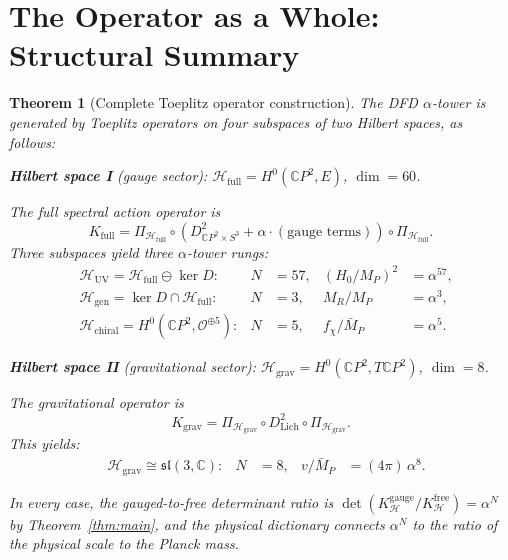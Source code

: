 \documentclass[11pt]{article}
\newtheorem{theorem}{Theorem}[section]
\theoremstyle{definition}
\theoremstyle{remark}
\newcommand{\CP}{\mathbb{C}P}
\newcommand{\Mp}{M_P}
\newcommand{\Mpr}{\bar{M}_P}
\begin{document}
\section{The Operator as a Whole: Structural Summary}
\label{sec:summary}

\begin{theorem}[Complete Toeplitz operator construction]
\label{thm:complete}
The DFD $\alpha$-tower is generated by Toeplitz operators on four
subspaces of two Hilbert spaces, as follows:

\medskip
\noindent\textbf{Hilbert space I} (gauge sector):
$\mathcal{H}_{\mathrm{full}} = H^0(\CP^2, E)$, $\dim = 60$.

The full spectral action operator is
\begin{equation}
K_{\mathrm{full}} = \Pi_{\mathcal{H}_{\mathrm{full}}} \circ
\left(D^2_{\CP^2 \times S^3} + \alpha \cdot (\text{gauge terms})\right)
\circ \Pi_{\mathcal{H}_{\mathrm{full}}}.
\end{equation}
Three subspaces yield three $\alpha$-tower rungs:
\begin{align}
&\mathcal{H}_{\mathrm{UV}} = \mathcal{H}_{\mathrm{full}} \ominus
\ker D: & N &= 57, & (H_0/\Mp)^2 &= \alpha^{57}, \\
&\mathcal{H}_{\mathrm{gen}} = \ker D \cap \mathcal{H}_{\mathrm{full}}:
& N &= 3, & M_R/\Mp &= \alpha^3, \\
&\mathcal{H}_{\mathrm{chiral}} = H^0(\CP^2, \mathcal{O}^{\oplus 5}):
& N &= 5, & f_\chi/\Mpr &= \alpha^5.
\end{align}

\medskip
\noindent\textbf{Hilbert space II} (gravitational sector):
$\mathcal{H}_{\mathrm{grav}} = H^0(\CP^2, T\CP^2)$, $\dim = 8$.

The gravitational operator is
\begin{equation}
K_{\mathrm{grav}} = \Pi_{\mathcal{H}_{\mathrm{grav}}} \circ
D^2_{\mathrm{Lich}} \circ \Pi_{\mathcal{H}_{\mathrm{grav}}}.
\end{equation}
This yields:
\begin{align}
&\mathcal{H}_{\mathrm{grav}} \cong \mathfrak{sl}(3,\mathbb{C}):
& N &= 8, & v/\Mpr &= (4\pi)\,\alpha^8.
\end{align}

\medskip
In every case, the gauged-to-free determinant ratio is
$\det(K^{\mathrm{gauge}}_{\mathcal{H}} / K^{\mathrm{free}}_{\mathcal{H}}) = \alpha^N$
by Theorem~\ref{thm:main}, and the physical dictionary connects
$\alpha^N$ to the ratio of the physical scale to the Planck mass.
\end{theorem}
\end{document}
